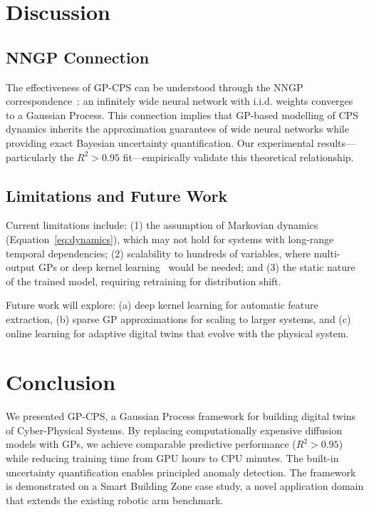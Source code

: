 \documentclass[conference]{IEEEtran}
\begin{document}
\section{Discussion}
\label{sec:discussion}

\subsection{NNGP Connection}
The effectiveness of GP-CPS can be understood through the NNGP correspondence~\cite{lee2018}: an infinitely wide neural network with i.i.d. weights converges to a Gaussian Process. This connection implies that GP-based modelling of CPS dynamics inherits the approximation guarantees of wide neural networks while providing exact Bayesian uncertainty quantification. Our experimental results---particularly the $R^2 > 0.95$ fit---empirically validate this theoretical relationship.

\subsection{Limitations and Future Work}
Current limitations include: (1) the assumption of Markovian dynamics (Equation~\ref{eq:dynamics}), which may not hold for systems with long-range temporal dependencies; (2) scalability to hundreds of variables, where multi-output GPs or deep kernel learning~\cite{wilson2016} would be needed; and (3) the static nature of the trained model, requiring retraining for distribution shift.

Future work will explore: (a) deep kernel learning for automatic feature extraction, (b) sparse GP approximations for scaling to larger systems, and (c) online learning for adaptive digital twins that evolve with the physical system.

\section{Conclusion}
\label{sec:conclusion}

We presented GP-CPS, a Gaussian Process framework for building digital twins of Cyber-Physical Systems. By replacing computationally expensive diffusion models with GPs, we achieve comparable predictive performance ($R^2 > 0.95$) while reducing training time from GPU hours to CPU minutes. The built-in uncertainty quantification enables principled anomaly detection. The framework is demonstrated on a Smart Building Zone case study, a novel application domain that extends the existing robotic arm benchmark.
\end{document}

